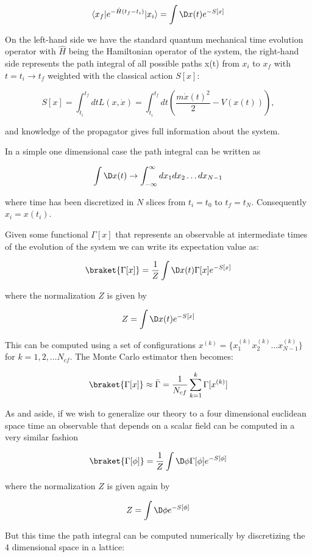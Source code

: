 \documentclass[%
oneside,                 %
final,                   %
10pt]{article}
\begin{document}
\[
	\langle x_f\vert e^{-\hat{H}(t_f-t_i)}\vert x_i\rangle = \int \D x(t) e^{-S[x]}
\]

On the left-hand side we have the standard quantum mechanical time
evolution operator with $\hat{H}$ being the Hamiltonian operator of
the system, the right-hand side represents the path integral of all possible paths
x(t) from $x_i$ to $x_f$ with $t = t_i \rightarrow t_f$ weighted with
the classical action $S[x]$:

\[
	S[x] = \int_{t_i}^{t_f} dt L(x,\dot{x}) =  \int_{t_i}^{t_f} dt \left( \frac{m\dot{x}(t)^2}{2} - V(x(t))\right),
\]

and  knowledge of the propagator gives full information about the system.

In a simple one dimensional case the path integral can be written as

\[
	 \int \D x(t) \rightarrow \int_{-\infty}^{\infty} dx_1dx_2\dots dx_{N-1}
\]

where time has been discretized in $N$ slices from $t_i = t_0$ to $t_f = t_N$. Consequently $x_i = x(t_i)$.  

Given some functional $\Gamma[x]$ that represents an observable at
intermediate times of the evolution of the system we can write its
expectation value as:

\[
	\braket{\Gamma[x]} = \frac{1}{Z} \int \D x(t) \Gamma[x] e^{-S[x]}
\]

where the normalization $Z$ is given by 

\[
	Z = \int \D x(t) e^{-S[x]}
\]

This can be computed using a set of configurations $x^{(k)} =
\{x^{(k)}_1x^{(k)}_2\dots x^{(k)}_{N-1} \}$ for $k = 1,2,\dots
N_{cf}$. The Monte Carlo estimator then becomes:

\[
	\braket{\Gamma[x]} \approx \bar{\Gamma} = \frac{1}{N_{cf}} \sum_{k = 1}^k \Gamma[x^{(k)}]
\]

As and aside, if we wish to  generalize our theory to a four dimensional
euclidean space time an observable that depends on a scalar field can
be computed in a very similar fashion

\[
	\braket{\Gamma[\phi]} = \frac{1}{Z} \int \D \phi \Gamma[\phi] e^{-S[\phi]}
\]

where the normalization $Z$ is given again by 

\[
	Z = \int \D \phi e^{-S[\phi]}
\]

But this time the path integral can be computed numerically by discretizing the 4 dimensional space in a lattice:
\end{document}
